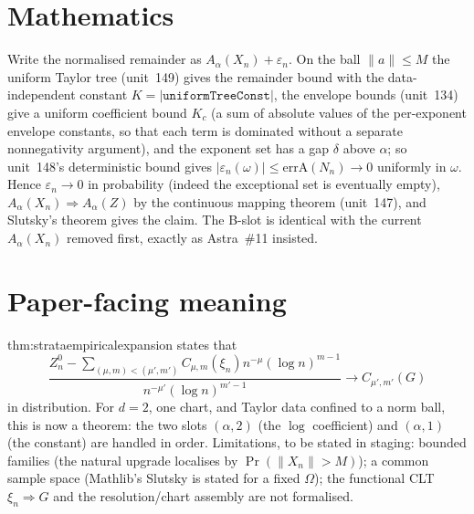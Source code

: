\documentclass[11pt]{article}
\begin{document}
\section{Mathematics}
Write the normalised remainder as $A_\alpha(X_n)+\varepsilon_n$. On the ball $\|a\|\le M$ the uniform
Taylor tree (unit~149) gives the remainder bound with the data-independent constant
$K=|\texttt{uniformTreeConst}|$, the envelope bounds (unit~134) give a uniform coefficient bound $K_c$
(a sum of absolute values of the per-exponent envelope constants, so that each term is dominated
without a separate nonnegativity argument), and the exponent set has a gap $\delta$ above $\alpha$;
so unit~148's deterministic bound gives $|\varepsilon_n(\omega)|\le\mathrm{errA}(N_n)\to0$ uniformly
in $\omega$. Hence $\varepsilon_n\to0$ in probability (indeed the exceptional set is eventually
empty), $A_\alpha(X_n)\Rightarrow A_\alpha(Z)$ by the continuous mapping theorem (unit~147), and
Slutsky's theorem gives the claim. The B-slot is identical with the current $A_\alpha(X_n)$ removed
first, exactly as Astra~\#11 insisted.

\section{Paper-facing meaning}
thm:strataempiricalexpansion states that
\[
\frac{Z_n^0-\sum_{(\mu,m)<(\mu',m')}C_{\mu,m}(\xi_n)n^{-\mu}(\log n)^{m-1}}{n^{-\mu'}(\log n)^{m'-1}}
\to C_{\mu',m'}(G)
\]
in distribution. For $d=2$, one chart, and Taylor data confined to a norm ball,
this is now a theorem: the two slots $(\alpha,2)$ (the $\log$ coefficient) and $(\alpha,1)$ (the
constant) are handled in order. Limitations, to be stated in staging: bounded families (the natural
upgrade localises by $\Pr(\|X_n\|>M)$); a common sample space (Mathlib's Slutsky is stated for a
fixed $\Omega$); the functional CLT $\xi_n\Rightarrow G$ and the resolution/chart assembly are not
formalised.
\end{document}
